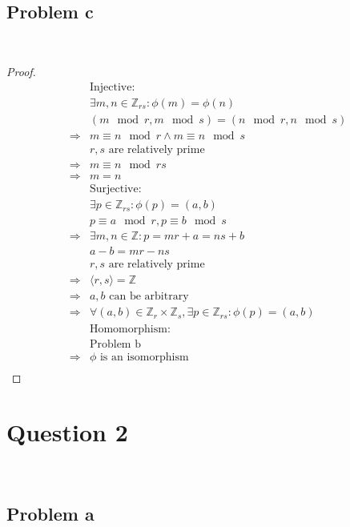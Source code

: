 \documentclass{article}
\begin{document}
~

\subsection*{Problem c}

~

\begin{proof}
    \begin{align*}
        &\text{Injective}:\\
        &\exists m,n\in \mathbb{Z} _{rs}:\phi(m)=\phi(n)\\
        &(m\mod r,m\mod s )=(n\mod r,n\mod s)\\
        \Rightarrow&m\equiv n\mod r\land m\equiv n\mod s\\
        &r,s\text{ are relatively prime}\\
        \Rightarrow&m\equiv n\mod rs\\
        \Rightarrow&m=n\\
        &\text{Surjective}:\\
        &\exists p\in\mathbb{Z} _{rs}:\phi(p)=(a,b)\\
        &p\equiv a\mod r,p\equiv b\mod s\\
        \Rightarrow&\exists m,n\in\mathbb{Z} :p=mr+a=ns+b\\
        &a-b=mr-ns\\
        &r,s\text{ are relatively prime}\\
        \Rightarrow&\langle r,s\rangle=\mathbb{Z} \\
        \Rightarrow&a,b\text{ can be arbitrary}\\
        \Rightarrow&\forall (a,b)\in \mathbb{Z} _r\times\mathbb{Z} _s,\exists p\in\mathbb{Z} _{rs}:\phi(p)=(a,b)\\
        &\text{Homomorphism}:\\
        &\text{Problem b}\\
        \Rightarrow&\phi\text{ is an isomorphism}\\
    \end{align*}
\end{proof}

\newpage

\section*{Question 2}

~

\subsection*{Problem a}
\end{document}
